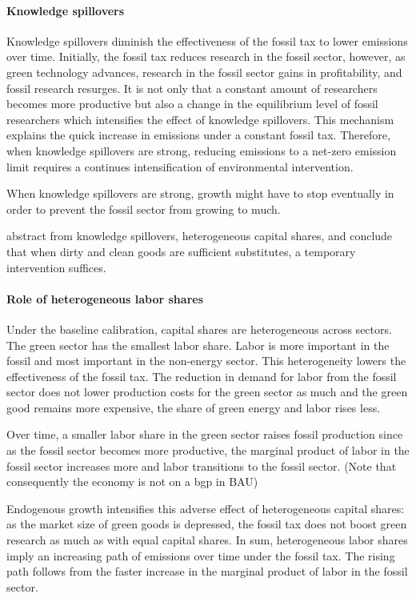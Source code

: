  \paragraph{Knowledge spillovers}
 Knowledge spillovers diminish the effectiveness of the fossil tax to lower emissions over time. Initially, the fossil tax reduces research in the fossil sector, however, as green technology advances, research in the fossil sector gains in profitability, and fossil research resurges. It is not only that a constant amount of researchers becomes more productive but also a change in the equilibrium level of fossil researchers which intensifies the effect of knowledge spillovers. This mechanism explains the quick increase in emissions under a constant fossil tax. Therefore, when knowledge spillovers are strong, reducing emissions to a net-zero emission limit requires a continues intensification of environmental intervention. 
 
 When knowledge spillovers are strong, growth might have to stop eventually in order to prevent the fossil sector from growing to much. 
 
 \cite{Acemoglu2012TheChange} abstract from knowledge spillovers, heterogeneous capital shares, and conclude that when dirty and clean goods are sufficient substitutes, a temporary intervention suffices. 
 \paragraph{Role of heterogeneous labor shares}
 Under the baseline calibration, capital shares are heterogeneous across sectors. The green sector has the smallest labor share. Labor is more important in the fossil and most important in the non-energy sector. This heterogeneity lowers the effectiveness of the fossil tax. The reduction in demand for labor from the fossil sector does not lower production costs for the green sector as much and the green good remains more expensive, the share of green energy and labor rises less. 

Over time, a smaller labor share in the green sector raises fossil production since as the fossil sector becomes more productive, the marginal product of labor in the fossil sector increases more and labor transitions to the fossil sector.  (Note that consequently the economy is not on a bgp in BAU)

Endogenous growth intensifies this adverse effect of heterogeneous capital shares: as the market size of green goods is depressed, the fossil tax does not boost green research as much as with equal capital shares. In sum, heterogeneous labor shares imply an increasing path of emissions over time under the fossil tax. The rising path follows from the faster increase in the marginal product of labor in the fossil sector. 
 

